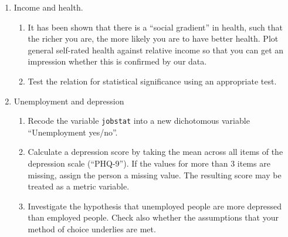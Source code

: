 \documentclass[]{article}
\begin{document}
\begin{enumerate}
\def\labelenumi{\arabic{enumi}.}
\setcounter{enumi}{4}
\itemsep1pt\parskip0pt
\item
  Income and health.

  \begin{enumerate}
  \def\labelenumii{\alph{enumii})}
  \itemsep1pt\parskip0pt
  \item
    It has been shown that there is a ``social gradient'' in health,
    such that the richer you are, the more likely you are to have better
    health. Plot general self-rated health against relative income so
    that you can get an impression whether this is confirmed by our
    data.\\
  \item
    Test the relation for statistical significance using an appropriate
    test.\\
  \end{enumerate}
\item
  Unemployment and depression

  \begin{enumerate}
  \def\labelenumii{\alph{enumii})}
  \itemsep1pt\parskip0pt
  \item
    Recode the variable \texttt{jobstat} into a new dichotomous variable
    ``Unemployment yes/no''.\\
  \item
    Calculate a depression score by taking the mean across all items of
    the depression scale (``PHQ-9''). If the values for more than 3
    items are missing, assign the person a missing value. The resulting
    score may be treated as a metric variable.\\
  \item
    Investigate the hypothesis that unemployed people are more depressed
    than employed people. Check also whether the assumptions that your
    method of choice underlies are met.
  \end{enumerate}
\end{enumerate}
\end{document}

